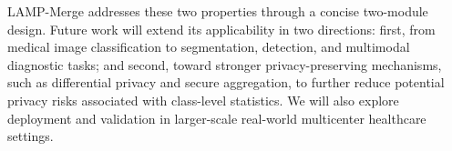 \documentclass[letterpaper]{article} %
\begin{document}
LAMP-Merge addresses these two properties through a concise two-module design. Future work will extend its applicability in two directions: first, from medical image classification to segmentation, detection, and multimodal diagnostic tasks; and second, toward stronger privacy-preserving mechanisms, such as differential privacy and secure aggregation, to further reduce potential privacy risks associated with class-level statistics. We will also explore deployment and validation in larger-scale real-world multicenter healthcare settings.
\end{document}

